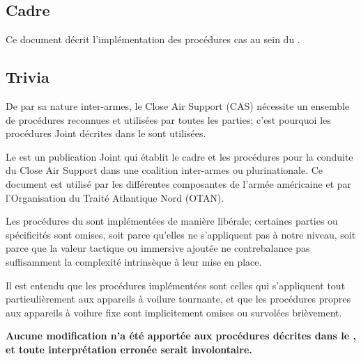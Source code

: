 \thispagestyle{default}

%

\subsection*{Cadre}

\vfil

Ce document décrit l'implémentation des procédures \acrfull{cas} au sein du \rgt{}.

\vfil

\subsection*{Trivia}

\vfil

De par sa nature inter-armes, le Close Air Support (CAS) nécessite un ensemble de procédures reconnues et utilisées par toutes les parties; c'est pourquoi les procédures Joint décrites dans le \jp{} sont utilisées.

\vfil

Le \jp{} est un publication Joint qui établit le cadre et les procédures pour la conduite du Close Air Support dans une coalition inter-armes ou plurinationale. Ce document est utilisé par les différentes composantes de l'armée américaine et par l'Organisation du Traité Atlantique Nord (OTAN).

\vfil

Les procédures du \jp{} sont implémentées de manière libérale; certaines parties ou spécificités sont omises, soit parce qu'elles ne s'appliquent pas à notre niveau, soit parce que la valeur tactique ou immersive ajoutée ne contrebalance pas suffisamment la complexité intrinsèque à leur mise en place.

\vfil

Il est entendu que les procédures implémentées sont celles qui s'appliquent tout particulièrement aux appareils à voilure tournante, et que les procédures propres aux appareils à voilure fixe sont implicitement omises ou survolées brièvement.

\vfil

\textbf{Aucune modification n'a été apportée aux procédures décrites dans le \jp{}, et toute interprétation erronée serait involontaire.}